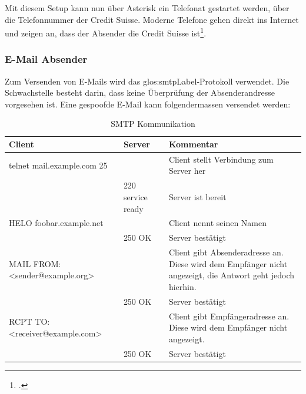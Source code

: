 Mit diesem Setup kann nun über Asterisk ein Telefonat gestartet werden, über die Telefonnummer der Credit Suisse. Moderne Telefone gehen direkt ins Internet und zeigen an, dass der Absender die Credit Suisse ist\footcite{Caller_ID_Spoofing_w_Asterisk_Allan_Feid_2015-05-18}.

\subsubsection{E-Mail Absender}
Zum Versenden von E-Mails wird das \gls{glos:smtpLabel}-Protokoll verwendet. Die Schwachstelle besteht darin, dass keine Überprüfung der Absenderandresse vorgesehen ist. Eine gespoofde E-Mail kann folgendermassen versendet werden:
\begin{table}[H]
   	\caption{SMTP Kommunikation}
   	\centering
  	
    \begin{tabular}{ | p{5cm} | p{2cm} | p{6cm} |}
	    \hline
	    
	    \textbf{Client} & 
	    \textbf{Server} & 
	    \textbf{Kommentar} \\ \hline
  			
  			telnet mail.example.com 25 &  
  			& 
  			Client stellt Verbindung zum Server her \\ \hline
  			
  			& 220 service ready & Server ist bereit\\ \hline
  			
  			HELO foobar.example.net &  
  			& 
  			Client nennt seinen Namen\\ \hline
  			
  			& 250 OK & Server bestätigt\\ \hline
  			
  			MAIL FROM:<sender@example.org> &  
  			& 
  			\parbox[t]{6cm}{Client gibt Absenderadresse an. \\ Diese wird dem Empfänger nicht angezeigt, die Antwort geht jedoch hierhin.} \\ \hline
  			
  			& 250 OK & Server bestätigt\\ \hline
  			
  			RCPT TO:<receiver@example.com> &  
  			& 
  			\parbox[t]{6cm}{Client gibt Empfängeradresse an. \\ Diese wird dem Empfänger nicht angezeigt.} \\ \hline
  			
  			& 250 OK & Server bestätigt\\ \hline
  			

\end{tabular}
\end{table}
